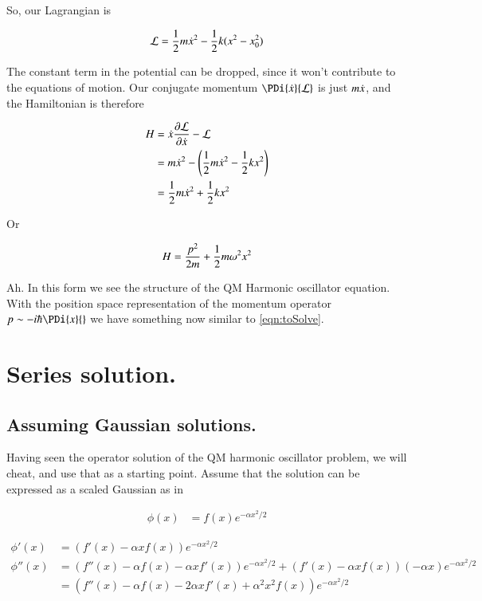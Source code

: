 \documentclass{article}
\begin{document}
So, our Lagrangian is

\begin{align*}
\mathcal{L} = \frac{1}{2}m \dot{x}^2 - \frac{1}{2} k (x^2 - x_0^2)
\end{align*}

The constant term in the potential can be dropped, since it won't contribute to the equations of motion.  Our conjugate momentum $\PDi{\xdot}{\LL}$ is just $m \dot{x}$, and the Hamiltonian
is therefore

\begin{align*}
H 
&= \dot{x} \frac{\partial {\mathcal{L}}}{\partial {\dot{x}}} - \mathcal{L} \\
&= m \dot{x}^2  - \left( \frac{1}{2}m \dot{x}^2 - \frac{1}{2} k x^2 \right) \\
&= \frac{1}{2} m \dot{x}^2  + \frac{1}{2} k x^2 \\
\end{align*}

Or

\begin{align*}
H &= \frac{p^2}{2 m } + \frac{1}{2} m \omega^2 x^2 \\
\end{align*}

Ah.  In this form we see the structure of the QM Harmonic oscillator equation.  With the position space representation of the momentum operator $p \sim -i \hbar \PDi{x}{}$ we have
something now similar to \ref{eqn:toSolve}.

\section{Series solution. }

\subsection{Assuming Gaussian solutions. }

Having seen the operator solution of the QM harmonic oscillator problem, we will cheat, and use that as a starting point.  Assume that
the solution can be expressed as a scaled Gaussian as in

\begin{align}
\phi(x) &= f(x) e^{ - \alpha x^2/2 }
\end{align}

\begin{align*}
\phi'(x) &= \left( f'(x) - \alpha x f(x) \right) e^{ - \alpha x^2/2 } \\
\phi''(x)
&=
\left( f''(x) - \alpha f(x) -\alpha x f'(x) \right) e^{ - \alpha x^2/2 }
+\left( f'(x) - \alpha x f(x) \right) (-\alpha x) e^{ - \alpha x^2/2 } \\
&=
\left( f''(x) - \alpha f(x) - 2 \alpha x f'(x) + \alpha^2 x^2 f(x) \right) e^{ - \alpha x^2/2 }
\end{align*}
\end{document}
